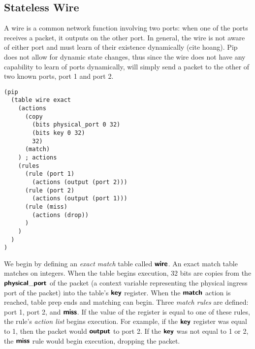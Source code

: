 \subsection{Stateless Wire}
\indent A wire is a common network function involving two ports: when one of the ports receives a packet, it outputs on the other port. In general, the wire is not aware of either port and must learn of their existence dynamically (cite hoang). Pip does not allow for dynamic state changes, thus since the wire does not have any capability to learn of ports dynamically, will simply send a packet to the other of two known ports, port 1 and port 2.
\begin{lstlisting}
(pip
  (table wire exact
    (actions
      (copy
        (bits physical_port 0 32)
        (bits key 0 32)
        32)
      (match)
    ) ; actions
    (rules
      (rule (port 1)
        (actions (output (port 2)))
      (rule (port 2)
        (actions (output (port 1)))
      (rule (miss)
        (actions (drop))
      )
    )
  )
)
\end{lstlisting}

We begin by defining an \textit{exact match} table called $\bm{\mathsf{{wire}}}$. An exact match table matches on integers. When the table begins execution, 32 bits are copies from the $\bm{\mathsf{{physical\_port}}}$ of the packet (a context variable representing the physical ingress port of the packet) into the table's $\bm{\mathsf{{key}}}$ register. When the $\bm{\mathsf{{match}}}$ action is reached, table prep ends and matching can begin. Three \textit{match rules} are defined: port 1, port 2, and $\bm{\mathsf{{miss}}}$. If the value of the  register is equal to one of these rules, the rule's \textit{action list} begins execution. For example, if the $\bm{\mathsf{{key}}}$ register was equal to 1, then the packet would $\bm{\mathsf{{output}}}$ to port 2. If the $\bm{\mathsf{{key}}}$ was not equal to 1 or 2, the $\bm{\mathsf{{miss}}}$ rule would begin execution, dropping the packet.

